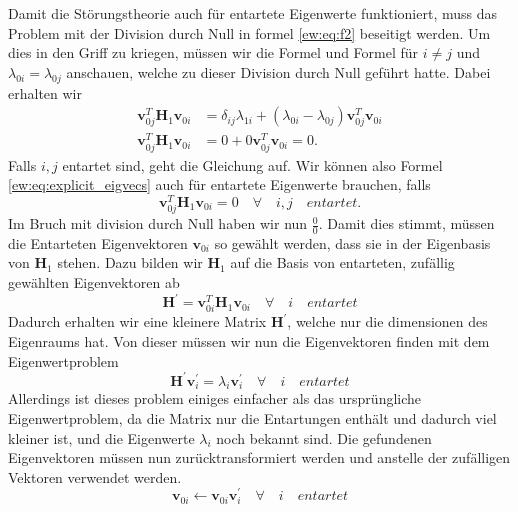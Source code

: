 Damit die Störungstheorie auch für entartete Eigenwerte funktioniert, muss das Problem mit der Division durch Null in formel \ref{ew:eq:f2} beseitigt werden.
Um dies in den Griff zu kriegen, müssen wir die Formel und Formel \label{ew:eq:f} für $i \neq j$ und $\lambda_{0i} = \lambda_{0j}$ anschauen, welche zu dieser Division durch Null geführt hatte.
Dabei erhalten wir
\begin{align}
    \bm v_{0j}^T \bm H_1 \bm v_{0i}
    &=
    \delta_{ij} \lambda_{1i} + 
    ( \lambda_{0i} - \lambda_{0j} )
    \bm v_{0j}^T  \bm v_{0i}
    \\
    \bm v_{0j}^T \bm H_1 \bm v_{0i}
    &=
    0 +
    0
    \bm v_{0j}^T  \bm v_{0i}
    = 0.
\end{align}
Falls $i, j$ entartet sind, geht die Gleichung auf. Wir können also Formel \ref{ew:eq:explicit_eigvecs} auch für entartete Eigenwerte brauchen, falls
\begin{equation}
    \bm v_{0j}^T \bm H_1 \bm v_{0i} = 0 \quad \forall \quad i,j \quad entartet.
\end{equation} \label{ew:eq:condition-degenerated}
Im Bruch mit division durch Null haben wir nun $\frac{0}{0}$.
Damit dies stimmt, müssen die Entarteten Eigenvektoren $\bm v_{0i}$ so gewählt werden, dass sie in der Eigenbasis von $\bm H_1$ stehen. %
Dazu bilden wir $\bm H_1$ auf die Basis von entarteten, zufällig gewählten Eigenvektoren ab
\begin{equation*}
    \bm H^\prime = \bm v_{0i}^T \bm H_1 \bm v_{0i} \quad \forall \quad i \quad entartet
\end{equation*}
Dadurch erhalten wir eine kleinere Matrix $\bm H^\prime$, welche nur die dimensionen des Eigenraums hat.
Von dieser müssen wir nun die Eigenvektoren finden mit dem Eigenwertproblem
\begin{equation*}
    \bm H^\prime \bm v_{i}^\prime = \lambda_{i} \bm v_i^\prime \quad \forall \quad i \quad entartet
\end{equation*}
Allerdings ist dieses problem einiges einfacher als das ursprüngliche Eigenwertproblem, da die Matrix nur die Entartungen enthält und dadurch viel kleiner ist, und die Eigenwerte $\lambda_i$ noch bekannt sind.
Die gefundenen Eigenvektoren müssen nun zurücktransformiert werden und anstelle der zufälligen Vektoren verwendet werden.
\begin{equation*}
    \bm v_{0i} \gets \bm v_{0i} \bm v_{i}^\prime \quad \forall \quad i \quad entartet
\end{equation*}

